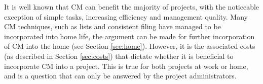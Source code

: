 \documentclass[cmpstyle]{ueacmpstyle}
\begin{document}
	It is well known that CM can benefit the majority of projects, with the noticeable exception of simple tasks, increasing efficiency and management quality.  Many CM techniques, such as lists and consistent filing have managed to be incorporated into home life, the argument can be made for further incorporation of CM into the home (see Section \ref{sec:home}). However, it is the associated costs (as described in Section \ref{sec:costs}) that dictate whether it is beneficial to incorporate CM into a project. This is true for both projects at work or home, and is a question that can only be answered by the project administrators.  
	
	\clearpage
	
	
\end{document}
